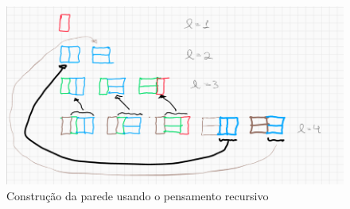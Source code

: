 \begin{exemplo}
\begin{figure}[!htbp]
\caption{Construção da parede usando o pensamento recursivo}
\label{fig::tijolos2}
\begin{center}
\includegraphics[scale=0.4]{images/tijolos.png} 
\end{center}
\end{figure}

\end{exemplo}



